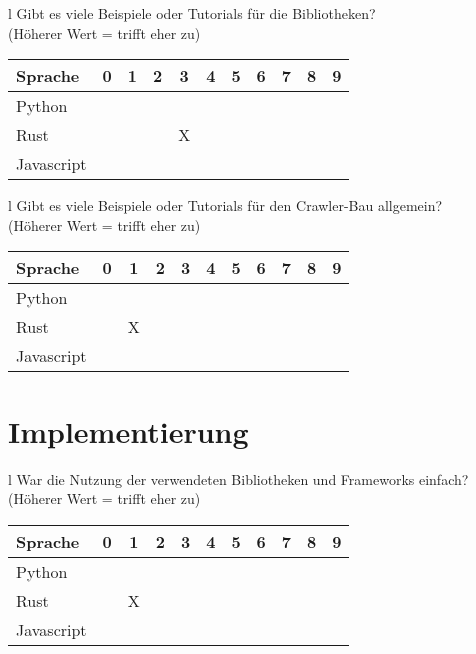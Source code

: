 \begin{tabular}{l}
	Gibt es viele Beispiele oder Tutorials für die Bibliotheken? \\
	(Höherer Wert = trifft eher zu)                              \\
	\begin{tabular}{| l | c | c | c | c | c | c | c | c | c | c |}
		\hline
		Sprache    & 0 & 1 & 2 & 3 & 4 & 5 & 6 & 7 & 8 & 9 \\
		\hline
		Python     &   &   &   &   &   &   &   &   &   &   \\
		\hline
		Rust       &   &   &   & X &   &   &   &   &   &   \\
		\hline
		Javascript &   &   &   &   &   &   &   &   &   &   \\
		\hline
	\end{tabular}
\end{tabular}

\begin{tabular}{l}
	Gibt es viele Beispiele oder Tutorials für den Crawler-Bau allgemein? \\
	(Höherer Wert = trifft eher zu)                                       \\
	\begin{tabular}{| l | c | c | c | c | c | c | c | c | c | c |}
		\hline
		Sprache    & 0 & 1 & 2 & 3 & 4 & 5 & 6 & 7 & 8 & 9 \\
		\hline
		Python     &   &   &   &   &   &   &   &   &   &   \\
		\hline
		Rust       &   & X &   &   &   &   &   &   &   &   \\
		\hline
		Javascript &   &   &   &   &   &   &   &   &   &   \\
		\hline
	\end{tabular}
\end{tabular}

\section{Implementierung}

\begin{tabular}{l}
	War die Nutzung der verwendeten Bibliotheken und Frameworks einfach? \\
	(Höherer Wert = trifft eher zu)                                      \\
	\begin{tabular}{| l | c | c | c | c | c | c | c | c | c | c |}
		\hline
		Sprache    & 0 & 1 & 2 & 3 & 4 & 5 & 6 & 7 & 8 & 9 \\
		\hline
		Python     &   &   &   &   &   &   &   &   &   &   \\
		\hline
		Rust       &   & X &   &   &   &   &   &   &   &   \\
		\hline
		Javascript &   &   &   &   &   &   &   &   &   &   \\
		\hline
	\end{tabular}
\end{tabular}

